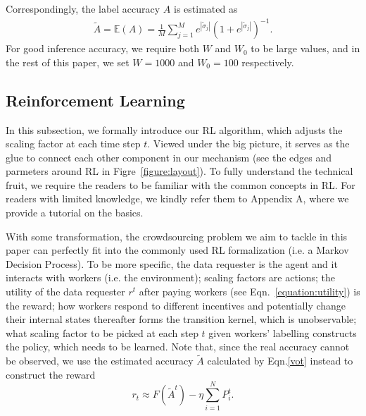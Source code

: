 Correspondingly, the label accuracy $A$ is estimated as
\begin{equation}
\label{vot}
\begin{split}
\tilde{A}=\mathbb{E}\left(A \right) = \frac{1}{M}{\sum}_{j=1}^{M}e^{|\tilde{\sigma}_j|}\left(1+e^{|\tilde{\sigma}_j|}\right)^{-1}.
\end{split}
\end{equation}
For good inference accuracy, we require both $W$ and $W_0$ to be large values, and in the rest of this paper, we set $W=1000$ and $W_0=100$ respectively.

\subsection{Reinforcement Learning}
In this subsection, we formally introduce our RL algorithm, which adjusts the scaling factor at each time step $t$. Viewed under the big picture, it serves as the glue to connect each other component in our mechanism (see the edges and parmeters around RL in Figre~\ref{figure:layout}). To fully understand the technical fruit, we require the readers to be familiar with the common concepts in RL. For readers with limited knowledge, we kindly refer them to Appendix A, where we provide a tutorial on the basics. %

With some transformation, the  crowdsourcing problem we aim to tackle in this paper can perfectly fit into the commonly used RL formalization (i.e. a Markov Decision Process). To be more specific, the data requester is the agent and it interacts with workers (i.e. the environment); scaling factors are actions; the utility of the data requester $r^t$ after paying workers (see Eqn.~\ref{equation:utility}) is the reward; how workers respond to different incentives and potentially change their internal states thereafter forms the transition kernel, which is unobservable; what scaling factor to be picked at each step $t$ given workers' labelling constructs the policy, which needs to be learned. Note that, since the real accuracy cannot be observed, we use the estimated accuracy $\tilde{A}$ calculated by Eqn.\ref{vot} instead to construct the reward
\[
r_t\approx F(\tilde{A}^t) - \eta {\sum}_{i=1}^{N}P^t_i.
\]

